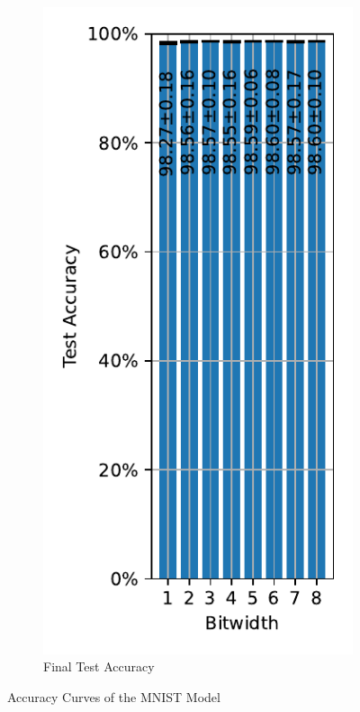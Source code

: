 \begin{figure}[H]
\begin{subfigure}[H]{0.3\textwidth}
                \includegraphics[width=\textwidth]{../standard/MNIST/plots/mnist_final_acc.pdf}
                \caption{Final Test Accuracy}
            \end{subfigure}
            \caption{Accuracy Curves of the MNIST Model}
        \end{figure}
    
